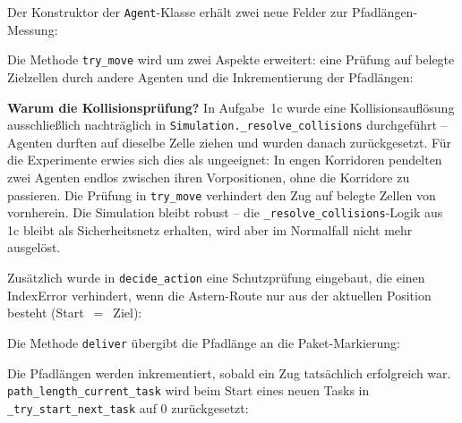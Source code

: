Der Konstruktor der \texttt{Agent}-Klasse erhält zwei neue Felder zur Pfadlängen-Messung:



Die Methode \texttt{try\_move} wird um zwei Aspekte erweitert: eine Prüfung auf belegte Zielzellen durch andere Agenten und die Inkrementierung der Pfadlängen:



\textbf{Warum die Kollisionsprüfung?} In Aufgabe~1c wurde eine Kollisionsauflösung ausschließlich nachträglich in \texttt{Simulation.\_resolve\_collisions} durchgeführt -- Agenten durften auf dieselbe Zelle ziehen und wurden danach zurückgesetzt. Für die Experimente erwies sich dies als ungeeignet: In engen Korridoren pendelten zwei Agenten endlos zwischen ihren Vorpositionen, ohne die Korridore zu passieren. Die Prüfung in \texttt{try\_move} verhindert den Zug auf belegte Zellen von vornherein. Die Simulation bleibt robust -- die \texttt{\_resolve\_collisions}-Logik aus 1c bleibt als Sicherheitsnetz erhalten, wird aber im Normalfall nicht mehr ausgelöst.

Zusätzlich wurde in \texttt{decide\_action} eine Schutzprüfung eingebaut, die einen IndexError verhindert, wenn die \acs{Astern}-Route nur aus der aktuellen Position besteht (Start~$=$~Ziel):



Die Methode \texttt{deliver} übergibt die Pfadlänge an die Paket-Markierung:



Die Pfadlängen werden inkrementiert, sobald ein Zug tatsächlich erfolgreich war. \texttt{path\_length\_current\_task} wird beim Start eines neuen Tasks in \texttt{\_try\_start\_next\_task} auf 0 zurückgesetzt:

